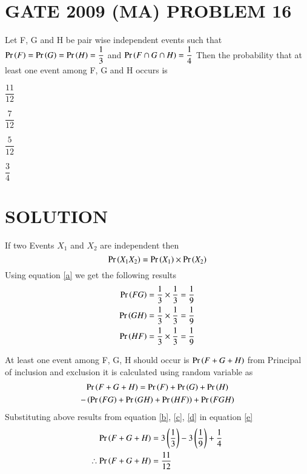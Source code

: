 \documentclass[journal,12pt,twocolumn]{IEEEtran}
\begin{document}
\section{GATE 2009 (MA) PROBLEM 16} 
Let F, G and H be pair wise independent events such that $\Pr\left(F\right)=\Pr\left(G\right)=\Pr\left(H\right)=\dfrac{1}{3}$ 
and $\Pr\left(F \cap G \cap H\right)=\dfrac{1}{4}$ Then the probability that at least one event among F, G and H occurs is 
\begin{enumerate}[(A)]
\begin{multicols}{4}
\setlength\itemsep{2em}
\item $\dfrac{11}{12}$
\item $\dfrac{7}{12}$
\item $\dfrac{5}{12}$
\item $\dfrac{3}{4}$
\end{multicols}
\end{enumerate}

\section{SOLUTION}
If two Events $X_1$ and $X_2$ are independent then 
\begin{equation}
\Pr\left(X_1 X_2\right) = \Pr\left(X_1\right) \times \Pr\left(X_2\right) \label{a}
\end{equation}
Using equation \eqref{a} we get the following results 
\begin{align}
\Pr\left(F G\right) &= \dfrac{1}{3} \times \dfrac{1}{3} = \dfrac{1}{9}\label{b} \\
\Pr\left(G H\right) &= \dfrac{1}{3} \times \dfrac{1}{3} = \dfrac{1}{9}\label{c} \\
\Pr\left(H F\right) &= \dfrac{1}{3} \times \dfrac{1}{3} = \dfrac{1}{9}\label{d}
\end{align}

At least one event among F, G, H should occur is $\Pr\left(F + G + H\right)$ 
from Principal of inclusion and exclusion it is calculated using random variable as
\begin{multline}
\Pr\left(F+G+H\right) = \Pr\left(F\right) + \Pr\left(G\right) + \Pr\left(H\right) \\
- \left(\Pr\left(F G\right) + \Pr\left(G H\right) + \Pr\left(H F\right)\right) + \Pr\left(F G H\right) \label{e}
\end{multline}
Substituting above results from equation \eqref{b}, \eqref{c}, \eqref{d} in equation \eqref{e}
\begin{align*}
\Pr\left(F+G+H\right) &= 3\left(\dfrac{1}{3}\right) - 3\left(\dfrac{1}{9}\right) + \dfrac{1}{4} \\
\therefore \Pr\left(F+G+H\right) &= \dfrac{11}{12}
\end{align*}
\end{document}

